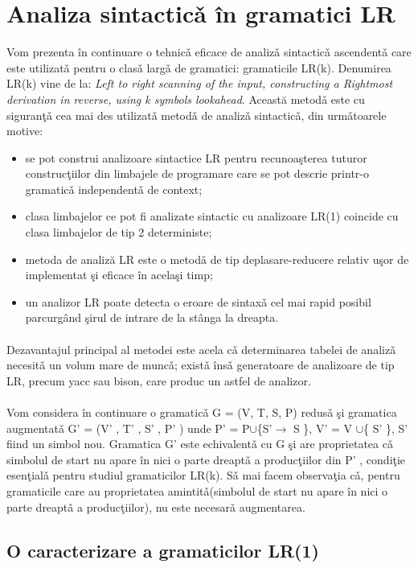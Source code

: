 \section{Analiza sintactic\v a \^ in gramatici LR }
Vom prezenta \^in continuare o tehnic\v a eficace de analiz\v a
sintactic\v a ascendent\v a
care este utilizat\v a
pentru o clas\v a
larg\v a de gramatici: gramaticile LR(k). Denumirea LR(k) vine de
la:
\textit{
Left to right scanning of the input, constructing a
Rightmost derivation in reverse, using k symbols lookahead}. Această metod\v a
este cu siguran\c t\v a
cea mai des utilizat\v a metod\v a de analiz\v a sintactic\v a, din urm\v atoarele motive:
\begin{itemize}
\item{
se pot construi analizoare sintactice LR pentru recunoa\c sterea tuturor
construc\c tiilor din limbajele de programare care se pot descrie printr-o gramatic\v a independent\v a
de context; 
}
\item{
clasa limbajelor ce pot fi analizate sintactic cu analizoare LR(1) coincide cu clasa
limbajelor de tip 2 deterministe; 
}
\item{
metoda de analiză LR este o metod\v a
de tip deplasare-reducere
relativ u\c sor de implementat
\c si eficace \^ in acela\c si timp; 
}
\item{
un analizor LR poate detecta o eroare de sintax\v a cel mai rapid posibil parcurg\^ and \c sirul de intrare de la st\^ anga la dreapta. 
}
\end{itemize}
\paragraph*{}
Dezavantajul principal al metodei este acela c\v a
determinarea tabelei de analiz\v a
necesit\v a un volum mare de munc\v a; exist\v a \^ ins\v a generatoare de analizoare de tip LR, precum yacc sau bison, care produc un astfel de analizor.
\paragraph*{}
Vom considera \^ in continuare o gramatic\v a
G = (V, T, S, P) redus\v a
\c si gramatica augmentat\v a G' = (V' , T' , S' , P' ) unde P' = P$\cup$\{S'$\rightarrow$ S \}, V' = V $\cup$\{ S' \}, S'
fiind un simbol nou. Gramatica G' este echivalent\v a cu G \c si are proprietatea c\v a
simbolul de start nu apare \^ in nici o parte dreapt\v a
a produc\c tiilor din P' , condi\c tie esen\c tial\v a pentru studiul
gramaticilor LR(k). S\v a
mai facem observa\c tia c\v a, pentru gramaticile care au proprietatea amintit\v a(simbolul de start nu apare \^ in nici o parte dreapt\v a
a produc\c tiilor), nu este
necesar\v a augmentarea.
\subsection{O caracterizare a gramaticilor LR(1)}       